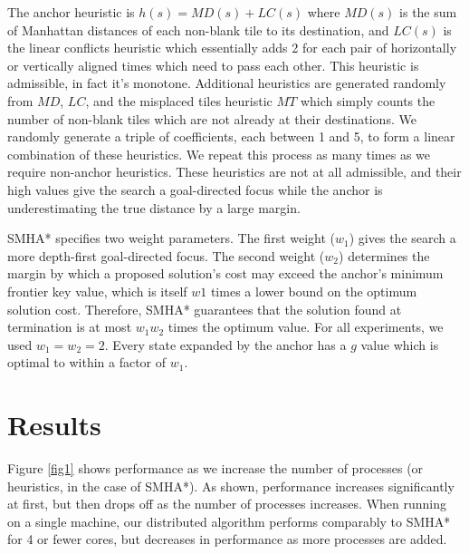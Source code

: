 \documentclass[11pt]{article}
\begin{document}
{The anchor heuristic is $h(s) = MD(s) + LC(s)$ where $MD(s)$ is the sum of Manhattan distances of each non-blank tile to its destination, and $LC(s)$ is the linear conflicts heuristic which essentially adds 2 for each pair of horizontally or vertically aligned times which need to pass each other. This heuristic is admissible, in fact it's monotone. Additional heuristics are generated randomly from $MD$, $LC$, and the misplaced tiles heuristic $MT$ which simply counts the number of non-blank tiles which are not already at their destinations. We randomly generate a triple of coefficients, each between 1 and 5, to form a linear combination of these heuristics. We repeat this process as many times as we require non-anchor heuristics. These heuristics are not at all admissible, and their high values give the search a goal-directed focus while the anchor is underestimating the true distance by a large margin.


SMHA* specifies two weight parameters. The first weight ($w_1$) gives the search a more depth-first goal-directed focus. The second weight ($w_2$) determines the margin by which a proposed solution's cost may exceed the anchor's minimum frontier key value, which is itself $w1$ times a lower bound on the optimum solution cost. Therefore, SMHA* guarantees that the solution found at termination is at most $w_1 w_2$ times the optimum value. For all experiments, we used $w_1 = w_2 = 2$. Every state expanded by the anchor has a $g$ value which is optimal to within a factor of $w_1$.

\section{Results}

Figure \ref{fig1} shows performance as we increase the number of processes (or heuristics, in the case of SMHA*). As shown, performance increases significantly at first, but then drops off as the number of processes increases. When running on a single machine, our distributed algorithm performs comparably to SMHA* for 4 or fewer cores, but decreases in performance as more processes are added.

}
\end{document}
